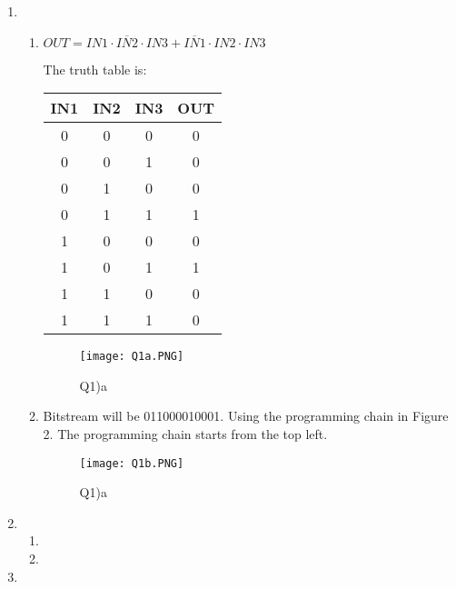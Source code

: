 \documentclass[11pt,letterpaper,titlepage]{article}
\begin{document}
\begin{enumerate}
    
    \item %
    
    \begin{enumerate}
        
        \item %
        
        $OUT = IN1 \cdot \overline{IN2} \cdot IN3 + \overline{IN1} \cdot IN2 \cdot IN3$
        
        The truth table is:
        
        \begin{table}[ht]
        \centering
        \begin{tabular}{@{}cccc@{}}
        \toprule
        IN1 & IN2 & IN3 & OUT \\ \midrule
        0   & 0   & 0   & 0   \\ \midrule
        0   & 0   & 1   & 0   \\ \midrule
        0   & 1   & 0   & 0   \\ \midrule
        0   & 1   & 1   & 1   \\ \midrule
        1   & 0   & 0   & 0   \\ \midrule
        1   & 0   & 1   & 1   \\ \midrule
        1   & 1   & 0   & 0   \\ \midrule
        1   & 1   & 1   & 0   \\ \bottomrule
        \end{tabular}
        \end{table}
        
        \begin{figure}[ht]
            \centering
            \texttt{[image: Q1a.PNG]}
            \caption{Q1)a}
        \end{figure}
        
        \newpage
        
        \item %
        
        Bitstream will be 011000010001. Using the programming chain in Figure 2. The programming chain starts from the top left.
        
        \begin{figure}[ht]
            \centering
            \texttt{[image: Q1b.PNG]}
            \caption{Q1)a}
        \end{figure}
        
    \end{enumerate}
    
    \item %
    
    \begin{enumerate}
        
        \item %
        
        \item %
        
    \end{enumerate}
    
    \item %
    
\end{enumerate}
\end{document}
